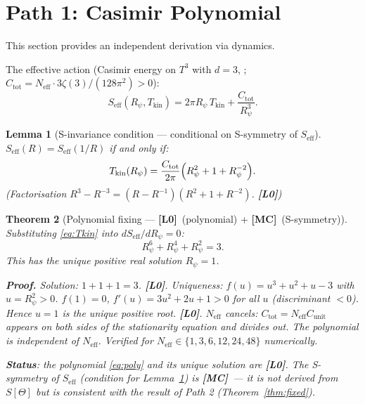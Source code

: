\documentclass[12pt,a4paper]{article}
\newtheorem{theorem}{Theorem}[section]
\newtheorem{lemma}[theorem]{Lemma}
\theoremstyle{definition}\newtheorem{definition}[theorem]{Definition}
\theoremstyle{remark}\newtheorem{remark}[theorem]{Remark}
\newcommand{\Lz}{\textbf{[L0]}}
\newcommand{\MC}{\textbf{[MC]}}
\begin{document}
\section{Path 1: Casimir Polynomial}
\label{sec:casimir}

This section provides an independent derivation via dynamics.

The effective action (Casimir energy on $T^3$ with $d=3$,
\cite{ambjorn_wolfram_1983}; $C_{\mathrm{tot}}=N_{\mathrm{eff}}
\cdot 3\zeta(3)/(128\pi^2) > 0$):
\[
  S_{\mathrm{eff}}(R_\psi, T_{\mathrm{kin}})
  = 2\pi R_\psi\,T_{\mathrm{kin}} + \frac{C_{\mathrm{tot}}}{R_\psi^3}.
\]

\begin{lemma}[S-invariance condition — conditional on S-symmetry of $S_{\mathrm{eff}}$]
\label{lem:Sinv}
$S_{\mathrm{eff}}(R) = S_{\mathrm{eff}}(1/R)$ if and only if:
\begin{equation}
  \label{eq:Tkin}
  T_{\mathrm{kin}}(R_\psi) = \frac{C_{\mathrm{tot}}}{2\pi}
  \Bigl(R_\psi^2 + 1 + R_\psi^{-2}\Bigr).
\end{equation}
\textup{(}Factorisation $R^3-R^{-3} = (R-R^{-1})(R^2+1+R^{-2})$. \Lz\textup{)}
\end{lemma}

\begin{theorem}[Polynomial fixing — \Lz\ (polynomial) + \MC\ (S-symmetry)]
\label{thm:poly}
Substituting \eqref{eq:Tkin} into $dS_{\mathrm{eff}}/dR_\psi=0$:
\begin{equation}
  \label{eq:poly}
  \boxed{R_\psi^6 + R_\psi^4 + R_\psi^2 = 3.}
\end{equation}
This has the unique positive real solution $R_\psi = 1$.

\textbf{Proof.}
\emph{Solution}: $1+1+1=3$. \Lz.
\emph{Uniqueness}: $f(u)=u^3+u^2+u-3$ with $u=R_\psi^2>0$.
$f(1)=0$, $f'(u)=3u^2+2u+1>0$ for all $u$ (discriminant $<0$).
Hence $u=1$ is the unique positive root. \Lz.
\emph{$N_{\mathrm{eff}}$ cancels}: $C_{\mathrm{tot}}=N_{\mathrm{eff}}
C_{\mathrm{unit}}$ appears on both sides of the stationarity equation
and divides out.  The polynomial is independent of $N_{\mathrm{eff}}$.
Verified for $N_{\mathrm{eff}}\in\{1,3,6,12,24,48\}$ numerically.

\textbf{Status}: the polynomial \eqref{eq:poly} and its unique
solution are \Lz.  The S-symmetry of $S_{\mathrm{eff}}$ (condition
for Lemma~\ref{lem:Sinv}) is \MC\ — it is not derived from $S[\Theta]$
but is consistent with the result of Path 2 (Theorem~\ref{thm:fixed}).
\end{theorem}
\end{document}
